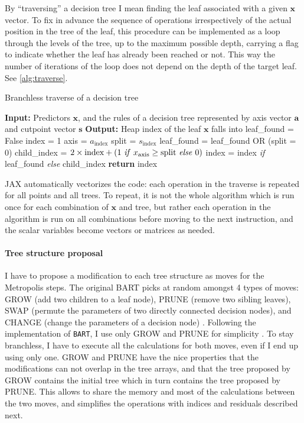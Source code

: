 \documentclass{article}
\begin{document}
    By ``traversing'' a decision tree I mean finding the leaf associated with a given $\mathbf x$ vector. To fix in advance the sequence of operations irrespectively of the actual position in the tree of the leaf, this procedure can be implemented as a loop through the levels of the tree, up to the maximum possible depth, carrying a flag to indicate whether the leaf has already been reached or not. This way the number of iterations of the loop does not depend on the depth of the target leaf. See \autoref{alg:traverse}.
    \begin{algorithm}[t]
        \caption{\label{alg:traverse} Branchless traverse of a decision tree}
        \begin{algorithmic}
            \STATE \textbf{Input:} Predictors $\mathbf x$, and the rules of a decision tree represented by axis vector $\mathbf a$ and cutpoint vector $\mathbf s$
            \STATE \textbf{Output:} Heap index of the leaf $\mathbf x$ falls into
            \STATE leaf\_found = False
            \STATE index = 1
                \STATE axis = $a_\text{index}$
                \STATE split = $s_\text{index}$
                \STATE leaf\_found = leaf\_found OR (split = 0)
                \STATE child\_index = $2 \times \text{index} + (\text{1 \emph{if} $x_\text{axis} \ge \text{split}$ \emph{else} 0})$
                \STATE index = index \emph{if} leaf\_found \emph{else} child\_index 
            \ENDFOR
            \STATE \textbf{return} index
        \end{algorithmic}
    \end{algorithm}
    JAX automatically vectorizes the code: each operation in the traverse is repeated for all points and all trees. To repeat, it is not the whole algorithm which is run once for each combination of $\mathbf x$ and tree, but rather each operation in the algorithm is run on all combinations before moving to the next instruction, and the scalar variables become vectors or matrices as needed.

    \paragraph{Tree structure proposal}

    I have to propose a modification to each tree structure as moves for the Metropolis steps. The original BART picks at random amongst 4 types of moves: GROW (add two children to a leaf node), PRUNE (remove two sibling leaves), SWAP (permute the parameters of two directly connected decision nodes), and CHANGE (change the parameters of a decision node) \citep[\S5.1, p.~940]{chipman1998}. Following the implementation of \texttt{BART}, I use only GROW and PRUNE for simplicity \citep[\S C, p.~57]{sparapani2021}. To stay branchless, I have to execute all the calculations for both moves, even if I end up using only one. GROW and PRUNE have the nice properties that the modifications can not overlap in the tree arrays, and that the tree proposed by GROW contains the initial tree which in turn contains the tree proposed by PRUNE. This allows to share the memory and most of the calculations between the two moves, and simplifies the operations with indices and residuals described next.
\end{document}
